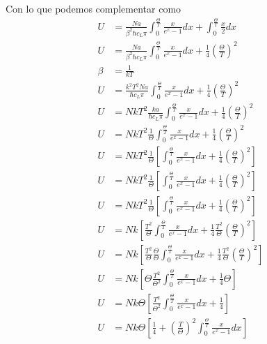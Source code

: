 \documentclass{report}
\begin{document}
Con lo que podemos  complementar como 
\begin{align*}
	U &=\frac{Na}{\beta^2\hbar c_L\pi}\int_{0}^{\frac{\Theta}{T}}\frac{x}{e^{x} - 1} dx +\int_{0}^{\frac{\Theta}{T}} \frac{x}{2} dx \\
	U &=\frac{Na}{\beta^2\hbar c_L\pi}\int_{0}^{\frac{\Theta}{T}}\frac{x}{e^{x} - 1} dx + \frac{1}{4}\left( \frac{\Theta}{T} \right)^2 \\
	\beta &= \frac{1}{kT}\\
	U &=\frac{k^2T^2 N a}{\hbar c_L\pi}\int_{0}^{\frac{\Theta}{T}}\frac{x}{e^{x} - 1} dx + \frac{1}{4}\left( \frac{\Theta}{T} \right)^2 \\
	U &=N k T^2 \frac{k a}{\hbar c_L\pi}\int_{0}^{\frac{\Theta}{T}}\frac{x}{e^{x} - 1} dx + \frac{1}{4}\left( \frac{\Theta}{T} \right)^2 \\
	U &=N k T^2 \frac{1}{\Theta} \int_{0}^{\frac{\Theta}{T}}\frac{x}{e^{x} - 1} dx + \frac{1}{4}\left( \frac{\Theta}{T} \right)^2 \\
	U &=N k T^2 \frac{1}{\Theta} \left[\int_{0}^{\frac{\Theta}{T}}\frac{x}{e^{x} - 1} dx + \frac{1}{4}\left( \frac{\Theta}{T} \right)^2\right] \\
	U &=N k T^2 \frac{1}{\Theta} \left[\int_{0}^{\frac{\Theta}{T}}\frac{x}{e^{x} - 1} dx + \frac{1}{4}\left( \frac{\Theta}{T} \right)^2\right] \\
	U &=N k T^2 \frac{1}{\Theta} \left[\int_{0}^{\frac{\Theta}{T}}\frac{x}{e^{x} - 1} dx + \frac{1}{4}\left( \frac{\Theta}{T} \right)^2\right] \\
	U &=N k \left[\frac{T^2}{\Theta} \int_{0}^{\frac{\Theta}{T}}\frac{x}{e^{x} - 1} dx + \frac{1}{4}\frac{T^2}{\Theta}\left( \frac{\Theta}{T} \right)^2\right] \\
	U &=N k \left[\frac{T^2}{\Theta} \frac{\Theta}{\Theta} \int_{0}^{\frac{\Theta}{T}}\frac{x}{e^{x} - 1} dx + \frac{1}{4}\frac{T^2}{\Theta}\left( \frac{\Theta}{T} \right)^2\right] \\
	U &=N k \left[\Theta\frac{T^2}{\Theta^2} \int_{0}^{\frac{\Theta}{T}}\frac{x}{e^{x} - 1} dx + \frac{1}{4}\Theta\right] \\
	U &=N k \Theta\left[\frac{T^2}{\Theta^2} \int_{0}^{\frac{\Theta}{T}}\frac{x}{e^{x}- 1} dx + \frac{1}{4}\right]\\
	U &=N k \Theta\left[\frac{1}{4} +\left(\frac{T}{\Theta}\right)^2 \int_{0}^{\frac{\Theta}{T}}\frac{x}{e^{x}- 1} dx\right]
\end{align*}


\section{}
\end{document}

